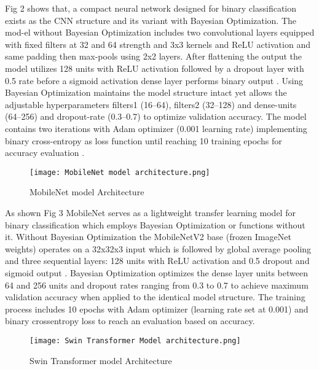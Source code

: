 \documentclass[runningheads]{llncs}
\begin{document}
Fig 2 shows that, a compact neural network designed for binary classification exists as the CNN structure and its variant with Bayesian Optimization. The mod-el without Bayesian Optimization includes two convolutional layers equipped with fixed filters at 32 and 64 strength and 3x3 kernels and ReLU activation and same padding then max-pools using 2x2 layers. After flattening the output the model utilizes 128 units with ReLU activation followed by a dropout layer with 0.5 rate before a sigmoid activation dense layer performs binary output \cite{rybczak2024}. Using Bayesian Optimization maintains the model structure intact yet allows the adjustable hyperparameters filters1 (16–64), filters2 (32–128) and dense-units (64–256) and dropout-rate (0.3–0.7) to optimize validation accuracy. The model contains two iterations with Adam optimizer (0.001 learning rate) implementing binary cross-entropy as loss function until reaching 10 training epochs for accuracy evaluation \cite{han2006,berrar2019,wu2021}.




\begin{figure}
    \centering
    \texttt{[image: MobileNet model architecture.png]}
    \caption{MobileNet model Architecture}
    \label{fig:enter-label}
\end{figure}

As shown Fig 3 MobileNet serves as a lightweight transfer learning model for binary classification which employs Bayesian Optimization or functions without it. Without Bayesian Optimization the MobileNetV2 base (frozen ImageNet weights) operates on a 32x32x3 input which is followed by global average pooling and three sequential layers: 128 units with ReLU activation and 0.5 dropout and sigmoid output \cite{g2020,li2024}. Bayesian Optimization optimizes the dense layer units between 64 and 256 units and dropout rates ranging from 0.3 to 0.7 to achieve maximum validation accuracy when applied to the identical model structure. The training process includes 10 epochs with Adam optimizer (learning rate set at 0.001) and binary crossentropy loss to reach an evaluation based on accuracy.


\begin{figure}
    \centering
    \texttt{[image: Swin Transformer Model architecture.png]}
    \caption{Swin Transformer model Architecture}
    \label{fig:enter-label}
\end{figure}
\end{document}
